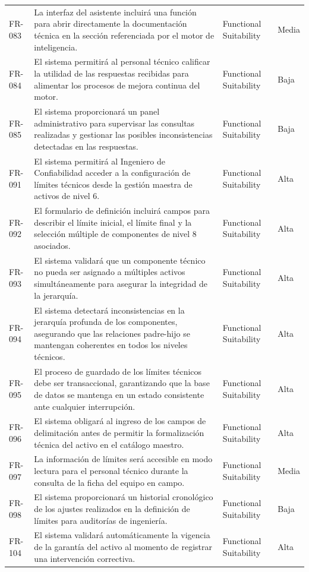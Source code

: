 \begin{longtable}{>{\raggedright\arraybackslash}p{} >{\raggedright\arraybackslash}p{} >{\raggedright\arraybackslash}p{} >{\raggedright\arraybackslash}p{}}
FR-083 & La interfaz del asistente incluirá una función para abrir directamente la documentación técnica en la sección referenciada por el motor de inteligencia. & Functional Suitability & Media \\
FR-084 & El sistema permitirá al personal técnico calificar la utilidad de las respuestas recibidas para alimentar los procesos de mejora continua del motor. & Functional Suitability & Baja \\
FR-085 & El sistema proporcionará un panel administrativo para supervisar las consultas realizadas y gestionar las posibles inconsistencias detectadas en las respuestas. & Functional Suitability & Baja \\
FR-091 & El sistema permitirá al Ingeniero de Confiabilidad acceder a la configuración de límites técnicos desde la gestión maestra de activos de nivel 6. & Functional Suitability & Alta \\
FR-092 & El formulario de definición incluirá campos para describir el límite inicial, el límite final y la selección múltiple de componentes de nivel 8 asociados. & Functional Suitability & Alta \\
FR-093 & El sistema validará que un componente técnico no pueda ser asignado a múltiples activos simultáneamente para asegurar la integridad de la jerarquía. & Functional Suitability & Alta \\
FR-094 & El sistema detectará inconsistencias en la jerarquía profunda de los componentes, asegurando que las relaciones padre-hijo se mantengan coherentes en todos los niveles técnicos. & Functional Suitability & Alta \\
FR-095 & El proceso de guardado de los límites técnicos debe ser transaccional, garantizando que la base de datos se mantenga en un estado consistente ante cualquier interrupción. & Functional Suitability & Alta \\
FR-096 & El sistema obligará al ingreso de los campos de delimitación antes de permitir la formalización técnica del activo en el catálogo maestro. & Functional Suitability & Alta \\
FR-097 & La información de límites será accesible en modo lectura para el personal técnico durante la consulta de la ficha del equipo en campo. & Functional Suitability & Media \\
FR-098 & El sistema proporcionará un historial cronológico de los ajustes realizados en la definición de límites para auditorías de ingeniería. & Functional Suitability & Baja \\
FR-104 & El sistema validará automáticamente la vigencia de la garantía del activo al momento de registrar una intervención correctiva. & Functional Suitability & Alta \\

\end{longtable}

